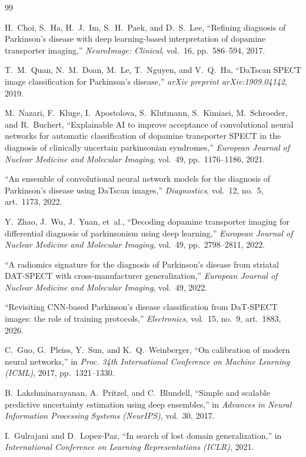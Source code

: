 \documentclass[11pt]{article}
\begin{document}
\bigskip
\begin{thebibliography}{99}

 H.~Choi, S.~Ha, H.~J.~Im, S.~H.~Paek, and D.~S.~Lee, ``Refining diagnosis of Parkinson's disease with deep learning-based interpretation of dopamine transporter imaging,'' \emph{NeuroImage: Clinical}, vol.~16, pp.~586--594, 2017.

 T.~M.~Quan, N.~M.~Doan, M.~Le, T.~Nguyen, and V.~Q.~Ha, ``DaTscan SPECT image classification for Parkinson's disease,'' \emph{arXiv preprint arXiv:1909.04142}, 2019.

 M.~Nazari, F.~Kluge, I.~Apostolova, S.~Klutmann, S.~Kimiaei, M.~Schroeder, and R.~Buchert, ``Explainable AI to improve acceptance of convolutional neural networks for automatic classification of dopamine transporter SPECT in the diagnosis of clinically uncertain parkinsonian syndromes,'' \emph{European Journal of Nuclear Medicine and Molecular Imaging}, vol.~49, pp.~1176--1186, 2021.

 ``An ensemble of convolutional neural network models for the diagnosis of Parkinson's disease using DaTscan images,'' \emph{Diagnostics}, vol.~12, no.~5, art.~1173, 2022.

 Y.~Zhao, J.~Wu, J.~Yuan, et~al., ``Decoding dopamine transporter imaging for differential diagnosis of parkinsonism using deep learning,'' \emph{European Journal of Nuclear Medicine and Molecular Imaging}, vol.~49, pp.~2798--2811, 2022.

 ``A radiomics signature for the diagnosis of Parkinson's disease from striatal DAT-SPECT with cross-manufacturer generalization,'' \emph{European Journal of Nuclear Medicine and Molecular Imaging}, vol.~49, 2022.

 ``Revisiting CNN-based Parkinson's disease classification from DaT-SPECT images: the role of training protocols,'' \emph{Electronics}, vol.~15, no.~9, art.~1883, 2026.

 C.~Guo, G.~Pleiss, Y.~Sun, and K.~Q.~Weinberger, ``On calibration of modern neural networks,'' in \emph{Proc. 34th International Conference on Machine Learning (ICML)}, 2017, pp.~1321--1330.

 B.~Lakshminarayanan, A.~Pritzel, and C.~Blundell, ``Simple and scalable predictive uncertainty estimation using deep ensembles,'' in \emph{Advances in Neural Information Processing Systems (NeurIPS)}, vol.~30, 2017.

 I.~Gulrajani and D.~Lopez-Paz, ``In search of lost domain generalization,'' in \emph{International Conference on Learning Representations (ICLR)}, 2021.

\end{thebibliography}
\end{document}
